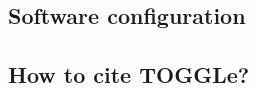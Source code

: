 \documentclass[a4paper]{article}
\begin{document}



\subsection{Software configuration}





\subsection{How to cite TOGGLe?}

\cite{Monat2015}

%

\end{document}
